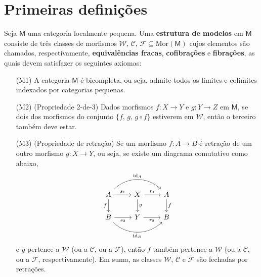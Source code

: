 \section{Primeiras definições}

\begin{defin}\label{defin:estrutura_de_modelos}
  Seja $\mathsf{M}$ uma categoria localmente pequena.
  Uma \textbf{estrutura de modelos} em $\mathsf{M}$ consiste de três classes de morfismos $\mathcal{W},\, \mathcal{C},\, \mathcal{F} \subseteq \mathrm{Mor}(\mathsf{M})$ cujos elementos são chamados, respectivamente, \textbf{equivalências fracas}, \textbf{cofibrações} e \textbf{fibrações}, as quais devem satisfazer os seguintes axiomas:
  \begin{enumerate}
  \item[(M1)] A categoria $\mathsf{M}$ é bicompleta, ou seja, admite todos os limites e colimites indexados por categorias pequenas.
    
  \item[(M2)] (Propriedade 2-de-3) Dados morfismos $f: X \to Y$ e $g: Y \to Z$ em $\mathsf{M}$, se dois dos morfismos do conjunto $\{f,\,g,\, g \circ f\}$ estiverem em $\mathcal{W}$, então o terceiro também deve estar.
    
  \item[(M3)] (Propriedade de retração) Se um morfismo $f: A \to B$ é retração de um outro morfismo $g: X \to Y$, ou seja, se existe um diagrama comutativo como abaixo,
    \begin{equation}\label{eq:diagrama_axioma_de_retracao}
      \begin{tikzcd}
        A
        \arrow[r, "s_1"]
        \arrow[d, "f" swap]
        \arrow[rr, bend left=45, "\id_{A}"]
        & X
        \arrow[r, "r_1"]
        \arrow[d, "g"]
        & A
        \arrow[d, "f"]
        \\ B
        \arrow[r, "s_2" swap]
        \arrow[rr, bend right=45, "\id_{B}" swap]
        & Y
        \arrow[r, "r_2" swap]
        & B
      \end{tikzcd}
    \end{equation}
    e $g$ pertence a $\mathcal{W}$ (ou a $\mathcal{C}$, ou a $\mathcal{F}$), então $f$ também pertence a $\mathcal{W}$ (ou a $\mathcal{C}$, ou a $\mathcal{F}$, respectivamente).
    Em suma, as classes $\mathcal{W}$, $\mathcal{C}$ e $\mathcal{F}$ são fechadas por retrações.
    

\end{enumerate}
\end{defin}
